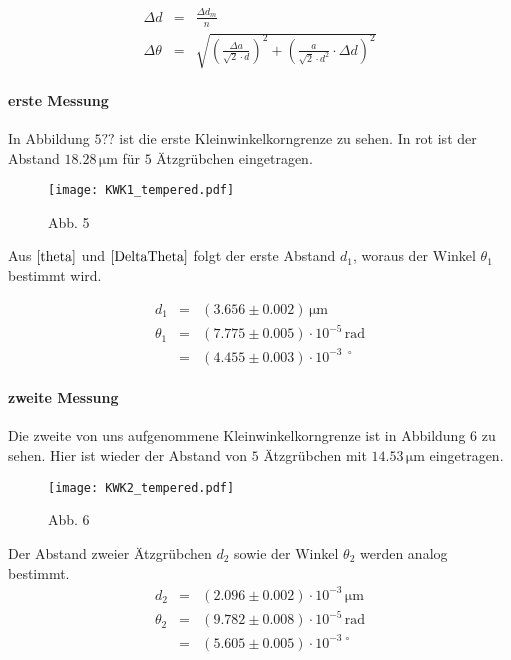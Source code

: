 \documentclass[12pt,a4paper]{scrartcl}
\numberwithin{equation}{section} %
\renewcommand{\[}{} %
\renewcommand{\]}{\noindent} %
\begin{document}
\[
\begin{eqnarray}
    \Delta d &=& \frac{\Delta d_m}{n} \\
    \Delta \theta &=& \sqrt{
        \left(\frac{\Delta a}{\sqrt{2} \cdot d} \right)^2
            + \left( \frac{a}{\sqrt{2} \cdot d^2} \cdot \Delta d \right)^2 }
            \label{DeltaTheta}
\end{eqnarray}
\]

\hypertarget{erste-messung}{%
\paragraph{erste Messung}\label{erste-messung}}

In Abbildung \(5??\) ist die erste Kleinwinkelkorngrenze zu sehen. In
rot ist der Abstand \(18.28 \mathrm{\, \mu m}\) für \(5\) Ätzgrübchen
eingetragen.

\begin{figure}
\centering
\texttt{[image: KWK1\_tempered.pdf]}
\caption{Abb. 5}
\end{figure}

Aus \(\eqref{theta}\) und \(\eqref{DeltaTheta}\) folgt der erste Abstand
\(d_1\), woraus der Winkel \(\theta_1\) bestimmt wird.

\[
\begin{eqnarray}
    d_1 &=& (3.656 \pm 0.002) \mathrm{\, \mu m} \\
    \theta_1 &=& (7.775 \pm 0.005) \cdot 10^{-5} \mathrm{\, rad} \\
        &=& (4.455 \pm 0.003) \cdot 10^{-3\ \ \circ}
\end{eqnarray}
\]

\hypertarget{zweite-messung}{%
\paragraph{zweite Messung}\label{zweite-messung}}

Die zweite von uns aufgenommene Kleinwinkelkorngrenze ist in Abbildung
\(6\) zu sehen. Hier ist wieder der Abstand von \(5\) Ätzgrübchen mit
\(14.53 \mathrm{\, \mu m}\) eingetragen.

\begin{figure}
\centering
\texttt{[image: KWK2\_tempered.pdf]}
\caption{Abb. 6}
\end{figure}

Der Abstand zweier Ätzgrübchen \(d_2\) sowie der Winkel \(\theta_2\)
werden analog bestimmt. \[
\begin{eqnarray}
    d_2 & = & (2.096\pm 0.002) \cdot 10^{-3} \mathrm{\, \mu m} \\
    \theta_2 &=& (9.782 \pm 0.008) \cdot 10^{-5} \mathrm{\, rad} \\
        &=& (5.605 \pm 0.005) \cdot 10^{-3\ \circ}
\end{eqnarray}
\]
\end{document}
